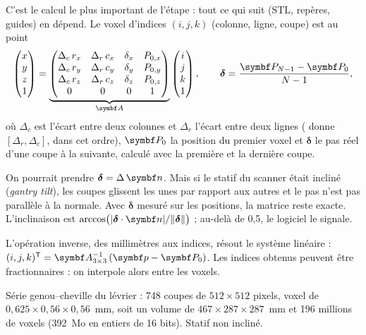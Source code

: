 C'est le calcul le plus important de l'étape : tout ce qui suit (STL, repères, guides) en dépend. Le voxel d'indices
$(i, j, k)$ (colonne, ligne, coupe) est au point
\begin{equation}
  \begin{pmatrix} x \\ y \\ z \\ 1 \end{pmatrix}
  = \underbrace{\begin{pmatrix}
    \Delta_c\, r_x & \Delta_r\, c_x & \delta_x & P_{0,x} \\
    \Delta_c\, r_y & \Delta_r\, c_y & \delta_y & P_{0,y} \\
    \Delta_c\, r_z & \Delta_r\, c_z & \delta_z & P_{0,z} \\
    0 & 0 & 0 & 1
  \end{pmatrix}}_{\mt{A}}
  \begin{pmatrix} i \\ j \\ k \\ 1 \end{pmatrix},
  \qquad
  \boldsymbol{\delta} = \frac{\vb{P}_{N-1} - \vb{P}_0}{N - 1},
  \label{eq:affine}
\end{equation}
où $\Delta_c$ est l'écart entre deux colonnes et $\Delta_r$ l'écart entre deux lignes ( donne
$[\Delta_r, \Delta_c]$, dans cet ordre), $\vb{P}_0$ la position du premier voxel et $\boldsymbol{\delta}$ le pas
réel d'une coupe à la suivante, calculé avec la première et la dernière coupe.

\begin{pourquoi}
On pourrait prendre $\boldsymbol{\delta} = \Delta\,\vb{n}$. Mais si le statif du scanner était incliné
(\emph{gantry tilt}), les coupes glissent les unes par rapport aux autres et le pas n'est pas parallèle à la normale.
Avec $\boldsymbol{\delta}$ mesuré sur les positions, la matrice reste exacte. L'inclinaison est
$\arccos\bigl(\abs{\boldsymbol{\delta}\cdot\vb{n}} / \norm{\boldsymbol{\delta}}\bigr)$ ; au-delà de 0,5\degre, le
logiciel le signale.
\end{pourquoi}

L'opération inverse, des millimètres aux indices, résout le système linéaire :
$(i, j, k)^{\mathsf T} = \mt{A}_{3\times3}^{-1}\,(\vb{p} - \vb{P}_0)$. Les indices obtenus peuvent être
fractionnaires : on interpole alors entre les voxels.

\begin{exemple}
Série genou--cheville du lévrier : 748 coupes de $512 \times 512$ pixels, voxel de
$0{,}625 \times 0{,}56 \times 0{,}56$~mm, soit un volume de $467 \times 287 \times 287$~mm et
196 millions de voxels (392~Mo en entiers de 16 bits). Statif non incliné.
\end{exemple}

